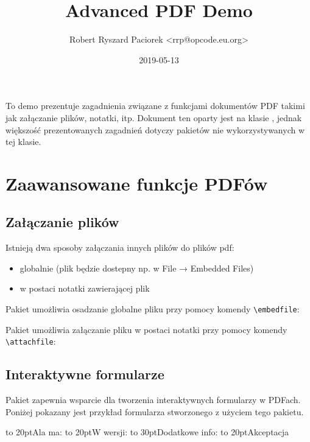 \documentclass[fontSize=10pt, rmargin=3cm, extra]{pdfArticle}
\title {Advanced PDF Demo}
\author{Robert Ryszard Paciorek <rrp@opcode.eu.org>}
\date  {2019-05-13}
\begin{document}
To demo prezentuje zagadnienia związane z funkcjami dokumentów PDF takimi jak załączanie plików, notatki, itp.
Dokument ten oparty jest na klasie ,
	jednak większość prezentowanych zagadnień dotyczy pakietów nie wykorzystywanych w tej klasie.

\section{Zaawansowane funkcje PDFów}

\subsection{Załączanie plików}

Istnieją dwa sposoby załączania innych plików do plików pdf:
\begin{itemize}
\item globalnie (plik będzie dostepny np. w File → Embedded Files)
\item w postaci notatki zawierającej plik
\end{itemize}

Pakiet  umożliwia osadzanie globalne pliku przy pomocy komendy \Verb$\embedfile$:

\vspace{7pt}
\begin{Example}
\end{Example}
\vspace{7pt}

Pakiet  umożliwia załączanie pliku w postaci notatki przy pomocy komendy \Verb$\attachfile$:

\vspace{7pt}
\begin{Example}
\end{Example}
\vspace{7pt}

\subsection{Interaktywne formularze}
Pakiet  zapewnia wsparcie dla tworzenia interaktywnych formularzy w PDFach. Poniżej pokazany jest przykład formularza stworzonego z użyciem tego pakietu.
\begin{ExampleVertical*}
\begin{Form}
	\vbox to 20pt{\vfill Ala ma:         \tabto{3cm}
		\TextField [bordercolor={}, default=bota, name=f1]{}
	}
	\vbox to 20pt{\vfill W wersji:       \tabto{3cm}
	}
	\vbox to 30pt{\vfill Dodatkowe info: \tabto{3cm}
		\TextField [bordercolor={}, multiline=true, height=20pt, name=f3]{}
	}
	\vbox to 20pt{\vfill Akceptacja      \tabto{3cm}
		\CheckBox  [bordercolor={}, name=f4]{}
	}
\end{Form}
\end{ExampleVertical*}
\end{document}

